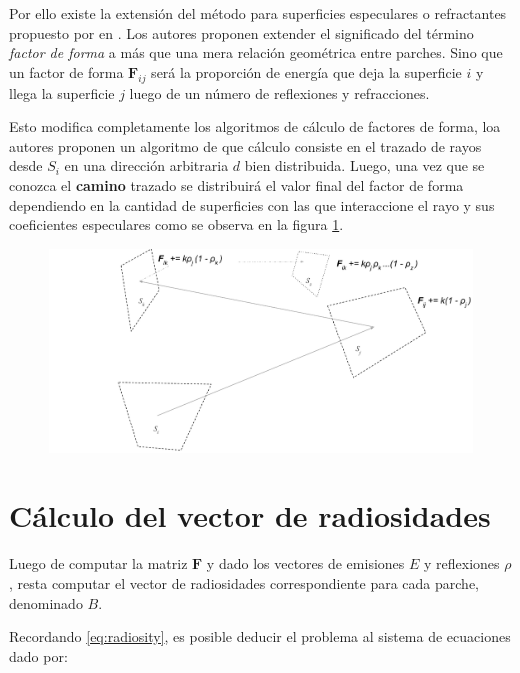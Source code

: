 Por ello existe la extensión del método para superficies especulares o refractantes propuesto por \citeauthor{Sillion} en \citeyear{Sillion}. Los autores proponen extender el significado del término \textit{factor de forma} a más que una mera relación geométrica entre parches. Sino que un factor de forma $\mathbf{F}_{ij}$ será la proporción de energía que deja la superficie $i$ y llega la superficie $j$ luego de un número de reflexiones y refracciones.

Esto modifica completamente los algoritmos de cálculo de factores de forma, loa autores proponen un algoritmo de  que cálculo consiste en el trazado de rayos desde $S_{i}$ en una dirección arbitraria $d$ bien distribuida.  Luego, una vez que se conozca el \textbf{camino} trazado se distribuirá el valor final del factor de forma dependiendo en la cantidad de superficies con las que interaccione el rayo y sus coeficientes especulares como se observa en la figura \ref{img:caminoespecular}.

\vspace{5mm}
\begin{figure}[H]
	\includegraphics[width=1\linewidth]{assets/extended}
	\label{img:caminoespecular}
\end{figure}

\section{Cálculo del vector de radiosidades}
\label{sec:vrad}

Luego de computar la matriz $\mathbf{F}$ y dado los vectores de emisiones $E$ y reflexiones $\rho$, resta computar el vector de radiosidades correspondiente para cada parche, denominado $B$.

Recordando \eqref{eq:radiosity}, es posible deducir el problema al sistema de ecuaciones dado por:

